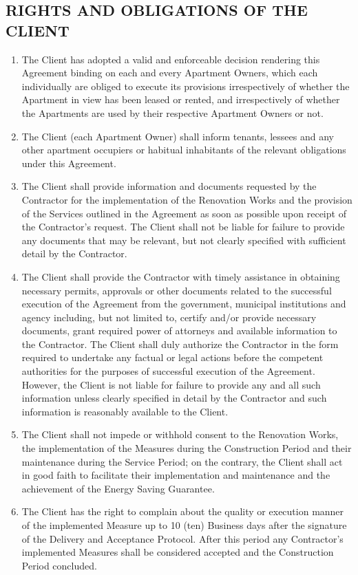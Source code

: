 \begin{multicols}{2}
\subsection{RIGHTS AND OBLIGATIONS OF THE CLIENT}
\begin{enumerate}
	\item The Client has adopted a valid and enforceable decision rendering this Agreement binding on each and every Apartment Owners, which each individually are obliged to execute its provisions irrespectively of whether the Apartment in view has been leased or rented, and irrespectively of whether the Apartments are used by their respective Apartment Owners or not. 
	\item The Client (each Apartment Owner) shall inform tenants, lessees and any other apartment occupiers or habitual inhabitants of the relevant obligations under this Agreement. 
	\item The Client shall provide information and documents requested by the Contractor for the implementation of the Renovation Works and the provision of the Services outlined in the Agreement as soon as possible upon receipt of the Contractor’s request. The Client shall not be liable for failure to provide any documents that may be relevant, but not clearly specified with sufficient detail by the Contractor. 
	\item The Client shall provide the Contractor with timely assistance in obtaining necessary permits, approvals or other documents related to the successful execution of the Agreement from the government, municipal institutions and agency including, but not limited to, certify and/or provide necessary documents, grant required power of attorneys and available information to the Contractor. The Client shall duly authorize the Contractor in the form required to undertake any factual or legal actions before the competent authorities for the purposes of successful execution of the Agreement. However, the Client is not liable for failure to provide any and all such information unless clearly specified in detail by the Contractor and such information is reasonably available to the Client. 
	\item The Client shall not impede or withhold consent to the Renovation Works, the implementation of the Measures during the Construction Period and their maintenance during the Service Period; on the contrary, the Client shall act in good faith to facilitate their implementation and maintenance and the achievement of the Energy Saving Guarantee. 
	\item The Client has the right to complain about the quality or execution manner of the implemented Measure up to 10 (ten) Business days after the signature of the Delivery and Acceptance Protocol. After this period any Contractor’s implemented Measures shall be considered accepted and the Construction Period concluded. 

\end{enumerate}
\end{multicols}
